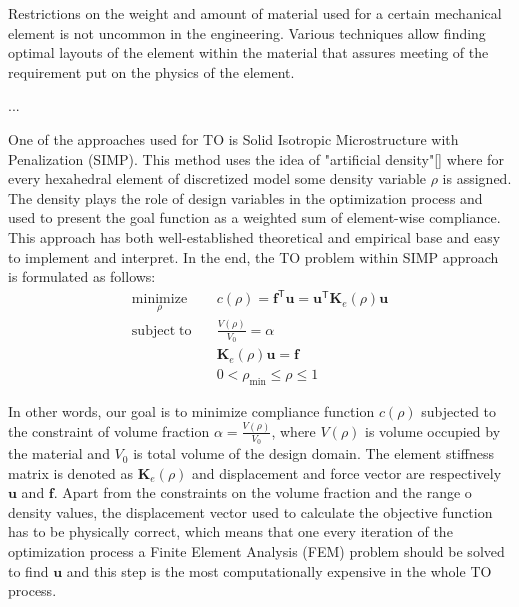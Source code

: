 Restrictions on the weight and amount of material used for a certain mechanical element is not uncommon in the engineering.
Various techniques allow finding optimal layouts of the element within the material that assures meeting of the requirement put on the physics of the element. 

...

One of the approaches used for TO is Solid Isotropic Microstructure with Penalization (SIMP).
This method uses the idea of "artificial density"\ref{} where for every hexahedral element of discretized model some density variable $\rho$ is assigned.
The density plays the role of design variables in the optimization process and used to present the goal function as a weighted sum of element-wise compliance.
This approach has both well-established theoretical and empirical base and easy to implement and interpret.
In the end, the TO problem within SIMP approach is formulated as follows:
	\begin{align*}
		\underset{\rho}{\mathrm{minimize}} \quad & c(\rho) = \mathbf{f}^{\mathsf{T}} \mathbf{u} = \mathbf{u}^{\mathsf{T}} \mathbf{K}_{e}(\rho) \mathbf{u} \\
		\mathrm{subject \; to} \quad & \frac{V(\rho)}{V_{0}} = \alpha \\
		& \mathbf{K}_{e}(\rho) \mathbf{u} = \mathbf{f} \\
		& 0 < \rho_{\min} \leq \rho \leq 1
	\end{align*} 

In other words, our goal is to minimize compliance function $c(\rho)$ subjected to the constraint of volume fraction $\alpha = \frac{V(\rho)}{V_{0}}$, where $V(\rho)$ is volume occupied by the material and $ V_{0} $ is total volume of the design domain.
The element stiffness matrix is denoted as $\mathbf{K}_{e}(\rho)$ and displacement and force vector are respectively $\mathbf{u}$ and $\mathbf{f}$.
Apart from the constraints on the volume fraction and the range o density values, the displacement vector used to calculate the objective function has to be physically correct, which means that one every iteration of the optimization process a Finite Element Analysis (FEM) problem should be solved to find $\mathbf{u}$ and this step is the most computationally expensive in the whole TO process.

